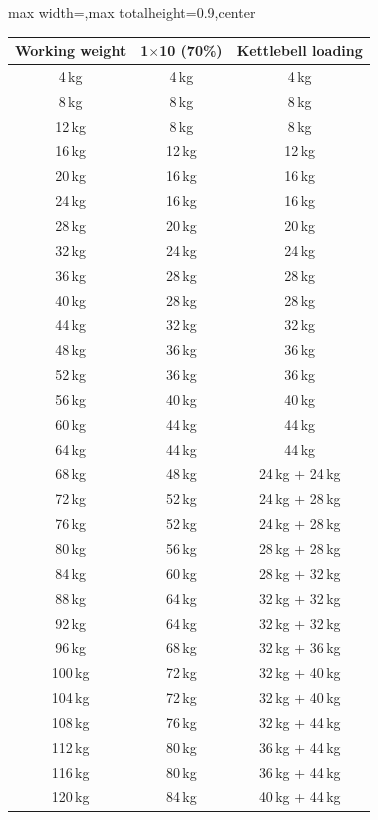 \documentclass[11pt,a4paper]{article}
\newcommand{\tablearraystretch}{1.15}
\begin{document}
\begin{center}
\renewcommand{\arraystretch}{\tablearraystretch}
\begin{adjustbox}{max width=\linewidth,max totalheight=0.9\textheight,center}
\begin{tabular}{ccc}
\toprule
Working weight &
1$\times$10 (70\%) &
Kettlebell loading \\
\midrule
4\,kg   & 4\,kg  & 4\,kg \\
8\,kg   & 8\,kg  & 8\,kg \\
12\,kg  & 8\,kg  & 8\,kg \\
16\,kg  & 12\,kg & 12\,kg \\
20\,kg  & 16\,kg & 16\,kg \\
24\,kg  & 16\,kg & 16\,kg \\
28\,kg  & 20\,kg & 20\,kg \\
32\,kg  & 24\,kg & 24\,kg \\
36\,kg  & 28\,kg & 28\,kg \\
40\,kg  & 28\,kg & 28\,kg \\
44\,kg  & 32\,kg & 32\,kg \\
48\,kg  & 36\,kg & 36\,kg \\
52\,kg  & 36\,kg & 36\,kg \\
56\,kg  & 40\,kg & 40\,kg \\
60\,kg  & 44\,kg & 44\,kg \\
64\,kg  & 44\,kg & 44\,kg \\
68\,kg  & 48\,kg & 24\,kg + 24\,kg \\
72\,kg  & 52\,kg & 24\,kg + 28\,kg \\
76\,kg  & 52\,kg & 24\,kg + 28\,kg \\
80\,kg  & 56\,kg & 28\,kg + 28\,kg \\
84\,kg  & 60\,kg & 28\,kg + 32\,kg \\
88\,kg  & 64\,kg & 32\,kg + 32\,kg \\
92\,kg  & 64\,kg & 32\,kg + 32\,kg \\
96\,kg  & 68\,kg & 32\,kg + 36\,kg \\
100\,kg & 72\,kg & 32\,kg + 40\,kg \\
104\,kg & 72\,kg & 32\,kg + 40\,kg \\
108\,kg & 76\,kg & 32\,kg + 44\,kg \\
112\,kg & 80\,kg & 36\,kg + 44\,kg \\
116\,kg & 80\,kg & 36\,kg + 44\,kg \\
120\,kg & 84\,kg & 40\,kg + 44\,kg \\
\bottomrule
\end{tabular}
\end{adjustbox}
\renewcommand{\arraystretch}{1}
\end{center}
\end{document}
